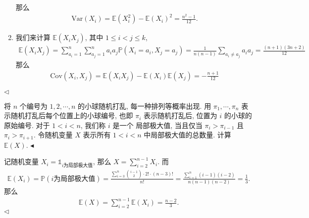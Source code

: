 \documentclass[11pt]{article}
\newenvironment{problem}[2][Problem]{\begin{trivlist}
    \item[\hskip \labelsep {\bfseries #1}\hskip \labelsep {\bfseries #2.}]\songti}{\hfill$\blacktriangleleft$\end{trivlist}}
\newenvironment{answer}[1][Solution]{\begin{trivlist}
    \item[\hskip \labelsep {\bfseries #1.}\hskip \labelsep]}{\hfill$\lhd$\end{trivlist}}
\newcommand\1{\mathds{1}}
\newcommand\E{\mathbb{E}}
\newcommand\PP{\mathbb{P}}
\newcommand\Var{\mathrm{Var}}
\newcommand\Cov{\mathrm{Cov}}
\begin{document}
\begin{answer}
\begin{enumerate}[label=(\arabic*)]
        那么
        \begin{align*}
            \Var(X_i) = \E(X_i^2) - \E(X_i)^2 = \frac{n^2-1}{12}.
        \end{align*}
        \item 我们来计算 $\E(X_iX_j)$, 其中 $1 \le i<j \le k$, 
        \begin{align*}
            \E(X_iX_j) = \sum_{a_i=1}^{n} \sum_{a_j=1}^{n} a_i a_j \PP(X_i = a_i, X_j = a_j)  = \frac{1}{n(n-1)} \sum_{a_i \neq a_j} a_i a_j = \frac{(n+1)(3n+2)}{12} 
        \end{align*}
        那么
        \begin{align*}
            \Cov(X_i, X_j) = \E(X_iX_j) - \E(X_i)\E(X_j) = -\frac{n+1}{12}
        \end{align*}
    \end{enumerate}
\end{answer}

\begin{problem}{2}
    将 $n$ 个编号为 $1,2, \cdots, n$ 的小球随机打乱, 每一种排列等概率出现. 用 $\pi_1, \cdots, \pi_n$ 表示随机打乱后每个位置上的小球编号, 也即 $\pi_i$ 表示随机打乱后, 位置为 $i$ 的小球的原始编号. 对于 $1< i < n$, 我们称 $i$ 是一个 {\kaishu 局部极大值}, 当且仅当 $\pi_{i} > \pi_{i-1}$ 且 $\pi_{i} > \pi_{i+1}$.  
    令随机变量 $X$ 表示所有 $1<i<n$ 中局部极大值的总数量. 计算 $\E(X)$.
\end{problem}
\begin{answer}
    记随机变量 $X_i = \1_{i\text{为局部极大值}}$, 那么 $X = \sum_{i=2}^{n-1} X_i$. 而
    \begin{align*}
        \E(X_i) = \PP(i\text{为局部极大值}) = \frac{\sum_{i=3}^{n}\binom{i-1}{2}\cdot 2! \cdot (n-3)!}{n!} = \frac{\sum_{i=1}^{n}(i-1)(i-2)}{n(n-1)(n-2)} = \frac{1}{3}.
    \end{align*}
    那么
    \begin{align*}
        \E(X) = \sum_{i=2}^{n-1}\E(X_i) = \frac{n-2}{3}.
    \end{align*}
\end{answer}
\end{document}
